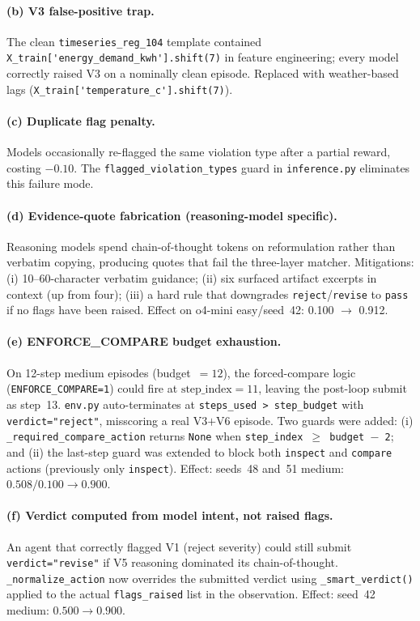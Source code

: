 \documentclass{article}
\begin{document}
\paragraph{(b) V3 false-positive trap.}
The clean \texttt{timeseries\_reg\_104} template contained
\verb|X_train['energy_demand_kwh'].shift(7)| in feature engineering;
every model correctly raised V3 on a nominally clean episode.
Replaced with weather-based lags
(\verb|X_train['temperature_c'].shift(7)|).

\paragraph{(c) Duplicate flag penalty.}
Models occasionally re-flagged the same violation type after a partial
reward, costing $-0.10$.  The \texttt{flagged\_violation\_types} guard
in \texttt{inference.py} eliminates this failure mode.

\paragraph{(d) Evidence-quote fabrication (reasoning-model specific).}
Reasoning models spend chain-of-thought tokens on reformulation rather
than verbatim copying, producing quotes that fail the three-layer
matcher.  Mitigations: (i) 10--60-character verbatim guidance; (ii)
six surfaced artifact excerpts in context (up from four); (iii) a
hard rule that downgrades \texttt{reject}/\texttt{revise} to
\texttt{pass} if no flags have been raised.  Effect on o4-mini
easy/seed~42: 0.100 $\to$ 0.912.

\paragraph{(e) ENFORCE\_COMPARE budget exhaustion.}
On 12-step medium episodes (budget~$=12$), the forced-compare logic
(\texttt{ENFORCE\_COMPARE=1}) could fire at $\text{step\_index}=11$,
leaving the post-loop submit as step~13.  \texttt{env.py}
auto-terminates at \texttt{steps\_used > step\_budget} with
\texttt{verdict="reject"}, misscoring a real V3$+$V6 episode.  Two
guards were added: (i) \texttt{\_required\_compare\_action} returns
\texttt{None} when \texttt{step\_index $\ge$ budget $-$ 2}; and (ii)
the last-step guard was extended to block both \texttt{inspect} and
\texttt{compare} actions (previously only \texttt{inspect}).
Effect: seeds~48 and~51 medium: $0.508/0.100 \to 0.900$.

\paragraph{(f) Verdict computed from model intent, not raised flags.}
An agent that correctly flagged V1 (reject severity) could still submit
\texttt{verdict="revise"} if V5 reasoning dominated its chain-of-thought.
\texttt{\_normalize\_action} now overrides the submitted verdict using
\texttt{\_smart\_verdict()} applied to the actual
\texttt{flags\_raised} list in the observation.
Effect: seed~42 medium: $0.500 \to 0.900$.
\end{document}
